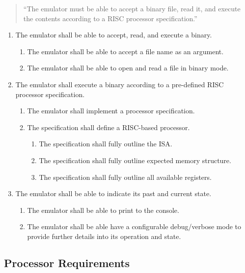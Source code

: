 \documentclass{article}
\begin{document}
\begin{quote}
    ``The emulator must be able to accept a binary file, read it, and execute the contents according to a RISC processor specification.''
\end{quote}

\begin{enumerate}[label=R\arabic*]
    \item The emulator shall be able to accept, read, and execute a binary.
    \begin{enumerate}[label=\theenumi.\arabic*]
        \item The emulator shall be able to accept a file name as an argument.
        \item The emulator shall be able to open and read a file in binary mode.
    \end{enumerate}
    \item The emulator shall execute a binary according to a pre-defined RISC processor specification.
    \begin{enumerate}[label=\theenumi.\arabic*]
        \item The emulator shall implement a processor specification.
        \item The specification shall define a RISC-based processor.
        \begin{enumerate}[label=\theenumii.\arabic*]
            \item The specification shall fully outline the ISA.
            \item The specification shall fully outline expected memory structure.
            \item The specification shall fully outline all available registers.
        \end{enumerate}
    \end{enumerate}
    \item The emulator shall be able to indicate its past and current state.
    \begin{enumerate}[label=\theenumi.\arabic*]
        \item The emulator shall be able to print to the console.
        \item The emulator shall be able have a configurable debug/verbose mode to provide further details into its operation and state.
    \end{enumerate}
\end{enumerate}

\subsection{Processor Requirements}
\end{document}
